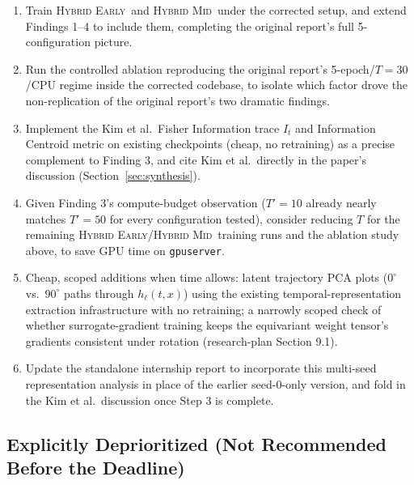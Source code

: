 \documentclass[11pt]{article}
\newcommand{\HybridEarly}{\textsc{Hybrid Early}}
\newcommand{\HybridMid}{\textsc{Hybrid Mid}}
\begin{document}
\begin{enumerate}[leftmargin=1.8em]
\item Train \HybridEarly\ and \HybridMid\ under the corrected setup, and extend Findings 1--4 to
include them, completing the original report's full 5-configuration picture.
\item Run the controlled ablation reproducing the original report's 5-epoch/$T = 30$/CPU regime
inside the corrected codebase, to isolate which factor drove the non-replication of the original
report's two dramatic findings.
\item Implement the Kim et al.\ Fisher Information trace $I_t$ and Information Centroid metric on
existing checkpoints (cheap, no retraining) as a precise complement to Finding 3, and cite Kim et
al.\ directly in the paper's discussion (Section~\ref{sec:synthesis}).
\item Given Finding 3's compute-budget observation ($T' = 10$ already nearly matches $T' = 50$ for
every configuration tested), consider reducing $T$ for the remaining \HybridEarly/\HybridMid\
training runs and the ablation study above, to save GPU time on \texttt{gpuserver}.
\item Cheap, scoped additions when time allows: latent trajectory PCA plots ($0^\circ$ vs.\
$90^\circ$ paths through $h_\ell(t, x)$) using the existing temporal-representation extraction
infrastructure with no retraining; a narrowly scoped check of whether surrogate-gradient training
keeps the equivariant weight tensor's gradients consistent under rotation (research-plan Section
9.1).
\item Update the standalone internship report to incorporate this multi-seed representation analysis
in place of the earlier seed-0-only version, and fold in the Kim et al.\ discussion once Step 3 is
complete.
\end{enumerate}

\subsection{Explicitly Deprioritized (Not Recommended Before the Deadline)}
\end{document}
